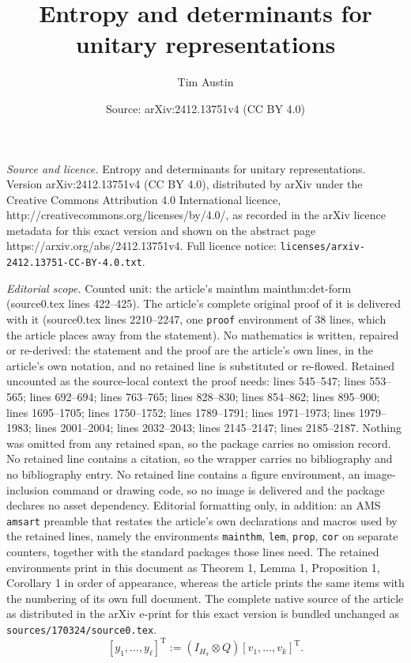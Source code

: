 \documentclass[10pt,a4paper]{amsart}
\title{Entropy and determinants for unitary representations}
\author{Tim Austin}
\date{Source: arXiv:2412.13751v4 (CC BY 4.0)}
\renewcommand{\rm}[1]{\mathrm{#1}}
\begin{document}
\maketitle

\noindent\emph{Source and licence.} Entropy and determinants for unitary representations. Version arXiv:2412.13751v4 (CC BY 4.0), distributed by arXiv under the Creative Commons Attribution 4.0 International licence, http://creativecommons.org/licenses/by/4.0/, as recorded in the arXiv licence metadata for this exact version and shown on the abstract page https://arxiv.org/abs/2412.13751v4. Full licence notice: \texttt{licenses/arxiv-2412.13751-CC-BY-4.0.txt}.\par\smallskip

\noindent\textit{Editorial scope.} Counted unit: the article's mainthm mainthm:det-form (source0.tex lines 422--425). The article's complete original proof of it is delivered with it (source0.tex lines 2210--2247, one \texttt{proof} environment of 38 lines, which the article places away from the statement). No mathematics is written, repaired or re-derived: the statement and the proof are the article's own lines, in the article's own notation, and no retained line is substituted or re-flowed.  Retained uncounted as the source-local context the proof needs: lines 545--547; lines 553--565; lines 692--694; lines 763--765; lines 828--830; lines 854--862; lines 895--900; lines 1695--1705; lines 1750--1752; lines 1789--1791; lines 1971--1973; lines 1979--1983; lines 2001--2004; lines 2032--2043; lines 2145--2147; lines 2185--2187.  Nothing was omitted from any retained span, so the package carries no omission record.  No retained line contains a citation, so the wrapper carries no bibliography and no bibliography entry.  No retained line contains a figure environment, an image-inclusion command or drawing code, so no image is delivered and the package declares no asset dependency.  Editorial formatting only, in addition: an AMS \texttt{amsart} preamble that restates the article's own declarations and macros used by the retained lines, namely the environments \texttt{mainthm}, \texttt{lem}, \texttt{prop}, \texttt{cor} on separate counters, together with the standard packages those lines need.  The retained environments print in this document as Theorem 1, Lemma 1, Proposition 1, Corollary 1 in order of appearance, whereas the article prints the same items with the numbering of its own full document.  The complete native source of the article as distributed in the arXiv e-print for this exact version is bundled unchanged as \texttt{sources/170324/source0.tex}.
\begin{equation}\label{eq:y-Q-v}
[y_1,\dots,y_\ell]^\rm{T} := (I_{H_\pi}\otimes Q)[v_1,\dots,v_k]^\rm{T}.
\end{equation}
\end{document}
